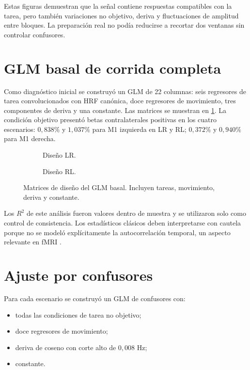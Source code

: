 Estas figuras demuestran que la señal contiene respuestas compatibles con la tarea, pero también variaciones no objetivo, deriva y fluctuaciones de amplitud entre bloques. La preparación real no podía reducirse a recortar dos ventanas sin controlar confusores.

\section{GLM basal de corrida completa}
Como diagnóstico inicial se construyó un GLM de 22 columnas: seis regresores de tarea convolucionados con HRF canónica, doce regresores de movimiento, tres componentes de deriva y una constante. Las matrices se muestran en \cref{fig:glm_design}. La condición objetivo presentó betas contralaterales positivas en los cuatro escenarios: $0{,}838\%$ y $1{,}037\%$ para M1 izquierda en LR y RL; $0{,}372\%$ y $0{,}940\%$ para M1 derecha.

\begin{figure}[H]
\centering
\begin{subfigure}[t]{0.49\textwidth}
\caption{Diseño LR.}
\end{subfigure}\hfill
\begin{subfigure}[t]{0.49\textwidth}
\caption{Diseño RL.}
\end{subfigure}
\caption{Matrices de diseño del GLM basal. Incluyen tareas, movimiento, deriva y constante.}
\label{fig:glm_design}
\end{figure}

Los $R^2$ de este análisis fueron valores dentro de muestra y se utilizaron solo como control de consistencia. Los estadísticos clásicos deben interpretarse con cautela porque no se modeló explícitamente la autocorrelación temporal, un aspecto relevante en fMRI \citep{Woolrich2001}.

\section{Ajuste por confusores}
Para cada escenario se construyó un GLM de confusores con:
\begin{itemize}
  \item todas las condiciones de tarea no objetivo;
  \item doce regresores de movimiento;
  \item deriva de coseno con corte alto de $0{,}008$ Hz;
  \item constante.
\end{itemize}

